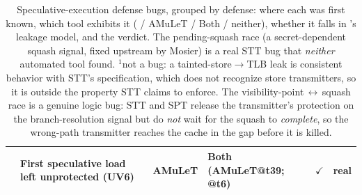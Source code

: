 \begin{table}[t]
\begin{tabular}{@{}p{2.3cm}p{4.7cm}p{3.0cm}p{3.1cm}cl@{}}
& First speculative load left unprotected (UV6) & AMuLeT & \textbf{Both} (\textcolor{camulet}{AMuLeT}@t39; \textcolor{cclean}{\toolname{}}@t6) & $\checkmark$ & \textcolor{ctarget}{real}\\
\bottomrule
\end{tabular}
\caption{Speculative-execution defense bugs, grouped by defense: where each was first
known, which tool exhibits it (\textcolor{cclean}{\toolname{}} / \textcolor{camulet}{AMuLeT}
/ Both / neither), whether it falls in \toolname{}'s leakage model, and the verdict. The
pending-squash race (a secret-dependent squash signal, fixed upstream by Mosier) is a real STT bug
that \emph{neither} automated tool found. $^{1}$not a bug: a tainted-store$\to$TLB leak is consistent behavior with STT's
specification, which does not recognize store transmitters, so it is outside the property STT claims to
enforce. The visibility-point\,$\leftrightarrow$\,squash race is a genuine logic bug: STT and SPT
release the transmitter's protection on the branch-resolution signal but do \emph{not} wait for the
squash to \emph{complete}, so the wrong-path transmitter reaches the cache in the gap before it is
killed.}
\label{tab:bugs}
\end{table}
\fi

